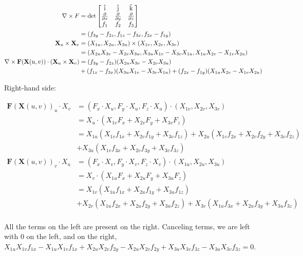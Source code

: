\begin{align*}
  \nabla \times F &= \operatorname{det} \begin{bmatrix}\mathrm{\hat{i}} & \mathrm{\hat{j}} & \mathrm{\hat{k}} \\ \frac{\partial}{\partial x} & \frac{\partial}{\partial y} & \frac{\partial}{\partial z} \\ f_1 & f_2 & f_3 \end{bmatrix} \\
  &= (f_{3y} - f_{2z}, f_{1z} - f_{3x}, f_{2x} - f_{1y}) \\
  \mathbf{X}_u \times \mathbf{X}_v &= (X_{1u}, X_{2u}, X_{3u}) \times (X_{1v}, X_{2v}, X_{3v}) \\
  &= (X_{2u}X_{3v} - X_{2v}X_{3u}, X_{3u}X_{1v} - X_{3v}X_{1u}, X_{1u}X_{2v} - X_{1v}X_{2u}) \\
  \nabla \times \mathbf{F}(\mathbf{X}(u, v)) \cdot (\mathbf{X}_u \times \mathbf{X}_v) &= (f_{3y} - f_{2z})(X_{2u}X_{3v} - X_{2v}X_{3u}) \\
  &+ (f_{1z} - f_{3x})(X_{3u}X_{1v} - X_{3v}X_{1u}) + (f_{2x} - f_{1y})(X_{1u}X_{2v} - X_{1v}X_{2u}) \\
\end{align*}

Right-hand side:

\begin{align*}
  \mathbf{F}(\mathbf{X}(u, v))_u \cdot X_v &= (F_x \cdot X_u, F_y \cdot X_u, F_z \cdot X_u) \cdot (X_{1v}, X_{2v}, X_{3v}) \\
  &= X_u \cdot (X_{1v}F_x + X_{2v}F_y + X_{3v}F_z) \\
  &= X_{1u}(X_{1v}f_{1x} + X_{2v}f_{1y} + X_{3v}f_{1z}) + X_{2u}(X_{1v}f_{2x} + X_{2v}f_{2y} + X_{3v}f_{2z}) \\
  &+ X_{3u}(X_{1v}f_{3x} + X_{2v}f_{3y} + X_{3v}f_{3z}) \\
  \mathbf{F}(\mathbf{X}(u, v))_v \cdot X_u &= (F_x \cdot X_v, F_y \cdot X_v, F_z \cdot X_v) \cdot (X_{1u}, X_{2u}, X_{3u}) \\
  &= X_v \cdot (X_{1u}F_x + X_{2u}F_y + X_{3u}F_z) \\
  &= X_{1v}(X_{1u}f_{1x} + X_{2u}f_{1y} + X_{3u}f_{1z})
  \\ &+ X_{2v}(X_{1u}f_{2x} + X_{2u}f_{2y} + X_{3u}f_{2z}) + X_{3v}(X_{1u}f_{3x} + X_{2u}f_{3y} + X_{3u}f_{3z}) \\
\end{align*}

All the terms on the left are present on the right. Canceling terms, we are left with 0 on the left, and on the right, $X_{1u}X_{1v}f_{1x} - X_{1u}X_{1v}f_{1x} + X_{2u}X_{2v}f_{2y} - X_{2u}X_{2v}f_{2y} + X_{3u}X_{3v}f_{3z} - X_{3u}X_{3v}f_{3z} = 0$.

